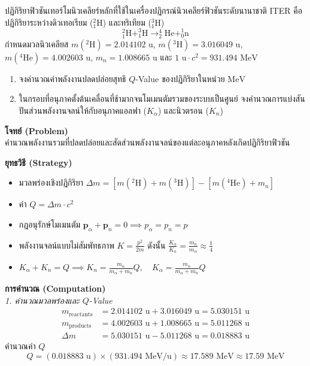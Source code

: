 \begin{psctexample}
ปฏิกิริยาฟิวชันเทอร์โมนิวเคลียร์หลักที่ใช้ในเครื่องปฏิกรณ์นิวเคลียร์ฟิวชันระดับนานาชาติ ITER คือปฏิกิริยาระหว่างดิวเทอเรียม ($^2_1\text{H}$) และทริเทียม ($^3_1\text{H}$)
\begin{equation}
^2_1\text{H} + ^3_1\text{H} \to ^4_2\text{He} + ^1_0\text{n}
\end{equation}
กำหนดมวลนิวเคลียส $m(^2\text{H}) = 2.014102\text{ u}$, $m(^3\text{H}) = 3.016049\text{ u}$, $m(^4\text{He}) = 4.002603\text{ u}$, $m_n = 1.008665\text{ u}$ และ $1\text{ u} \cdot c^2 = 931.494\text{ MeV}$
\begin{enumerate}
    \item จงคำนวณค่าพลังงานปลดปล่อยสุทธิ $Q$-Value ของปฏิกิริยาในหน่วย $\text{MeV}$
    \item ในกรอบที่อนุภาคตั้งต้นเคลื่อนที่ช้ามากจนโมเมนตัมรวมของระบบเป็นศูนย์ จงคำนวณการแบ่งสันปันส่วนพลังงานจลน์ให้กับอนุภาคแอลฟา ($K_\alpha$) และนิวตรอน ($K_n$)
\end{enumerate}

\textbf{โจทย์ (Problem)} \\
คำนวณพลังงานรวมที่ปลดปล่อยและสัดส่วนพลังงานจลน์ของแต่ละอนุภาคหลังเกิดปฏิกิริยาฟิวชัน

\textbf{ยุทธวิธี (Strategy)} \\
\begin{itemize}
    \item มวลพร่องเชิงปฏิกิริยา $\Delta m = [m(^2\text{H}) + m(^3\text{H})] - [m(^4\text{He}) + m_n]$
    \item ค่า $Q = \Delta m \cdot c^2$
    \item กฎอนุรักษ์โมเมนตัม $\mathbf{p}_\alpha + \mathbf{p}_n = 0 \implies p_\alpha = p_n = p$
    \item พลังงานจลน์แบบไม่สัมพัทธภาพ $K = \frac{p^2}{2m}$ ดังนั้น $\frac{K_\alpha}{K_n} = \frac{m_n}{m_\alpha} \approx \frac{1}{4}$
    \item $K_\alpha + K_n = Q \implies K_n = \frac{m_\alpha}{m_\alpha + m_n} Q, \quad K_\alpha = \frac{m_n}{m_\alpha + m_n} Q$
\end{itemize}

\textbf{การคำนวณ (Computation)} \\
\textit{1. คำนวณมวลพร่องและ $Q$-Value}
\begin{align}
m_{\text{reactants}} &= 2.014102\text{ u} + 3.016049\text{ u} = 5.030151\text{ u} \nonumber \\
m_{\text{products}} &= 4.002603\text{ u} + 1.008665\text{ u} = 5.011268\text{ u} \nonumber \\
\Delta m &= 5.030151\text{ u} - 5.011268\text{ u} = 0.018883\text{ u}
\end{align}
คำนวณค่า $Q$
\begin{equation}
Q = (0.018883\text{ u}) \times (931.494\text{ MeV/u}) \approx 17.589\text{ MeV} \approx 17.59\text{ MeV}
\end{equation}


\end{psctexample}

